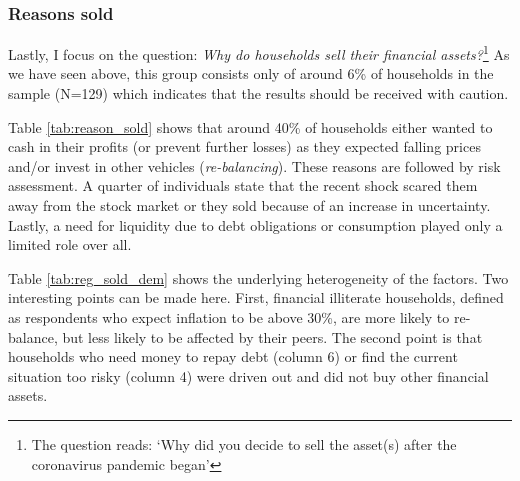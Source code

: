 \documentclass[ProjectABM]{subfiles}
\begin{document}
\subsubsection{Reasons sold}
Lastly, I focus on the question: \textit{Why do households sell their financial assets?}\footnote{The question reads: `Why did you decide to sell the asset(s) after the coronavirus pandemic began'} As we have seen above, this group consists only of around 6\% of households in the sample (N=129) which indicates that the results should be received with caution.



Table \ref{tab:reason_sold} shows that around 40\% of households either wanted to cash in their profits (or prevent further losses) as they expected falling prices and/or invest in other vehicles (\textit{re-balancing}). These reasons are followed by risk assessment. A quarter of individuals state that the recent shock scared them away from the stock market or they sold because of an increase in uncertainty. Lastly, a need for liquidity due to debt obligations or consumption played only a limited role over all. %



Table \ref{tab:reg_sold_dem} shows the underlying heterogeneity of the factors. Two interesting points can be made here. First, financial illiterate households, defined as respondents who expect inflation to be above 30\%, are more likely to re-balance, but less likely to be affected by their peers. The second point is that households who need money to repay debt (column 6) or find the current situation too risky (column 4) were driven out and did not buy other financial assets. %
\end{document}

